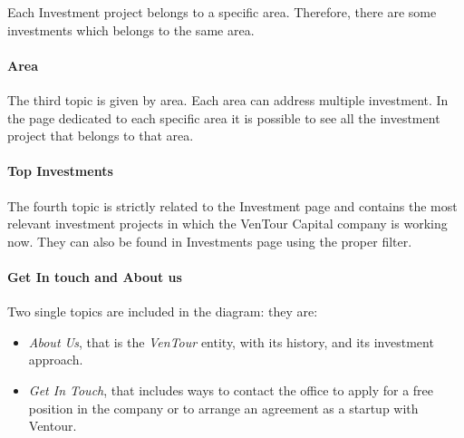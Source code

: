 \documentclass[../../DD.tex]{subfiles}
\begin{document}
    Each Investment project belongs to a specific area. Therefore, there are some investments which belongs to the same area.

    \paragraph{Area} The third topic is given by area. Each area can address multiple investment. In the page dedicated to each specific area it is possible to see all the investment project that belongs to that area.

    \paragraph{Top Investments} The fourth topic is strictly related to the Investment page and contains the most relevant investment projects in which the VenTour Capital company is working now. They can also be found in Investments page using the proper filter.
    
	\paragraph{Get In touch and About us} Two single topics are included in the diagram: they are: 
 \begin{itemize}
     \item \textit{About Us}, that is the \textit{VenTour} entity, with its history, and its investment approach.
     \item \textit{Get In Touch}, that includes ways to contact the office to apply for a free position in the company or to arrange an agreement as a startup with Ventour.
 \end{itemize}
\end{document}
